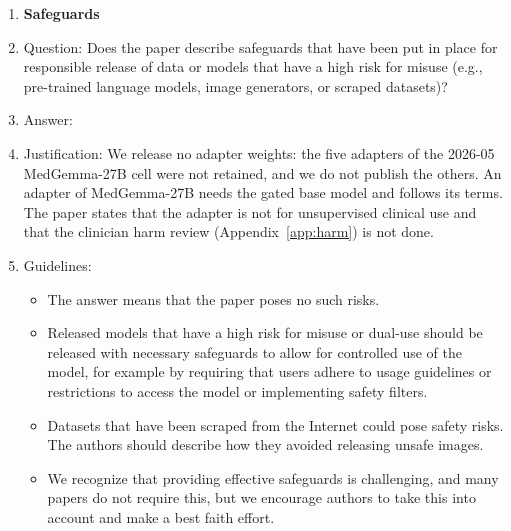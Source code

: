 \begin{enumerate}
\item {\bf Safeguards}
    \item[] Question: Does the paper describe safeguards that have been put in place for responsible release of data or models that have a high risk for misuse (e.g., pre-trained language models, image generators, or scraped datasets)?
    \item[] Answer: \answerYes{}
    \item[] Justification: We release no adapter weights: the five adapters of the 2026-05 MedGemma-27B cell were not retained, and we do not publish the others. An adapter of MedGemma-27B needs the gated base model and follows its terms. The paper states that the adapter is not for unsupervised clinical use and that the clinician harm review (Appendix~\ref{app:harm}) is not done.
    \item[] Guidelines:
    \begin{itemize}
        \item The answer \answerNA{} means that the paper poses no such risks.
        \item Released models that have a high risk for misuse or dual-use should be released with necessary safeguards to allow for controlled use of the model, for example by requiring that users adhere to usage guidelines or restrictions to access the model or implementing safety filters.
        \item Datasets that have been scraped from the Internet could pose safety risks. The authors should describe how they avoided releasing unsafe images.
        \item We recognize that providing effective safeguards is challenging, and many papers do not require this, but we encourage authors to take this into account and make a best faith effort.
    \end{itemize}


\end{enumerate}
